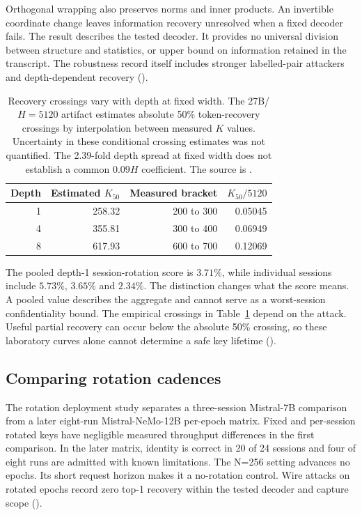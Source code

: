 Orthogonal wrapping also preserves norms and inner products. An invertible
coordinate change leaves information recovery unresolved when a fixed
decoder fails. The result describes the tested decoder. It provides
no universal division between structure and statistics, or upper bound on
information retained in the transcript. The robustness record itself
includes stronger labelled-pair attackers and depth-dependent recovery
().

\begin{table}[t]
\centering\small
\begin{tabular}{@{}rrrr@{}}
\toprule
Depth & Estimated $K_{50}$ & Measured bracket & $K_{50}/5120$ \\
\midrule
1 & 258.32 & 200 to 300 & 0.05045 \\
4 & 355.81 & 300 to 400 & 0.06949 \\
8 & 617.93 & 600 to 700 & 0.12069 \\
\bottomrule
\end{tabular}
\caption{Recovery crossings vary with depth at fixed width.
The 27B/$H=5120$ artifact estimates absolute 50\% token-recovery crossings
by interpolation between measured $K$ values. Uncertainty in these
conditional crossing estimates was not quantified.
The 2.39-fold depth spread at fixed width does not establish a common
$0.09H$ coefficient. The source is .}
\label{tab:k50}
\end{table}

The pooled depth-1 session-rotation score is $3.71\%$, while individual
sessions include $5.73\%$, $3.65\%$ and $2.34\%$. The distinction changes
what the score means. A pooled value describes the aggregate and cannot
serve as a worst-session confidentiality bound. The empirical crossings in Table~\ref{tab:k50}
depend on the attack. Useful partial recovery can occur below the absolute 50\%
crossing, so these laboratory curves alone cannot determine a safe key
lifetime ().

\subsection{Comparing rotation cadences}

The rotation deployment study separates a three-session Mistral-7B
comparison from a later eight-run Mistral-NeMo-12B per-epoch matrix.
Fixed and per-session rotated keys have negligible measured throughput
differences in the first comparison. In the later matrix, identity is
correct in 20 of 24 sessions and four of eight runs are admitted with known
limitations. The N=256 setting advances no epochs. Its short request horizon makes
it a no-rotation control. Wire attacks on rotated epochs
record zero top-1 recovery within the tested decoder and capture scope
().

